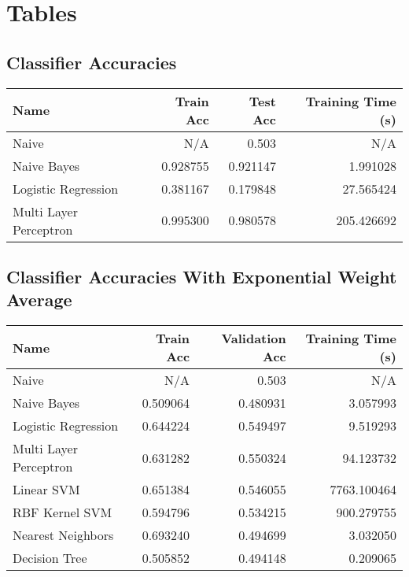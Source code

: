\documentclass[10pt, oneside]{article}   	%
\begin{document}
\section*{Tables}


\subsection*{Classifier Accuracies}
\begin{tabular}{lrrr}
\toprule
                   Name &  Train Acc &  Test Acc &  Training Time (s) \\
\midrule
                  Naive &        N/A &       0.503 &                N/A \\
            Naive Bayes &   0.928755 &  0.921147 &           1.991028 \\
    Logistic Regression &   0.381167 &  0.179848 &          27.565424 \\
 Multi Layer Perceptron &   0.995300 &  0.980578 &         205.426692 \\
\bottomrule
\end{tabular}




\subsection*{Classifier Accuracies With Exponential Weight Average}

\begin{tabular}{lrrr}
\toprule
                   Name &  Train Acc &  Validation Acc &  Training Time (s) \\
\midrule
                  Naive &        N/A &       0.503 &                N/A \\
            Naive Bayes &   0.509064 &  0.480931 &           3.057993 \\
    Logistic Regression &   0.644224 &  0.549497 &           9.519293 \\
 Multi Layer Perceptron &   0.631282 &  0.550324 &          94.123732 \\
             Linear SVM &   0.651384 &  0.546055 &        7763.100464 \\
         RBF Kernel SVM &   0.594796 &  0.534215 &         900.279755 \\
      Nearest Neighbors &   0.693240 &  0.494699 &           3.032050 \\
          Decision Tree &   0.505852 &  0.494148 &           0.209065 \\
\bottomrule
\end{tabular}
\end{document}
